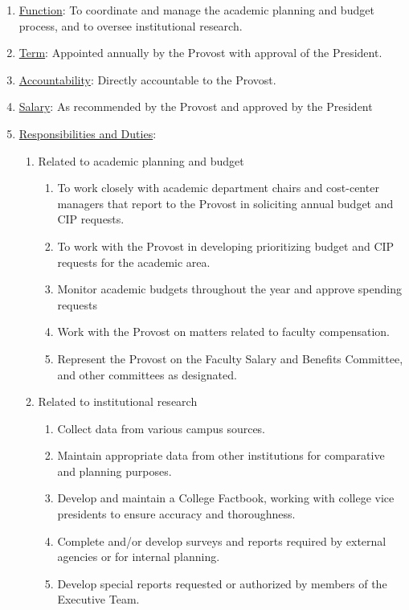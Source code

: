 \documentclass[letterpaper, 11pt]{article}
\begin{document}
					\begin{enumerate}[label=\alph*)]
						\item{\underline{Function}:  To coordinate and manage the academic planning and budget process, and to oversee institutional research.}
						\item{\underline{Term}:  Appointed annually by the Provost with approval of the President.}
						\item{\underline{Accountability}:  Directly accountable to the Provost.}
						\item{\underline{Salary}:  As recommended by the Provost and approved by the President}
						\item{\underline{Responsibilities and Duties}:
							\begin{enumerate}[label=\arabic*)]
								\item{Related to academic planning and budget
									\begin{enumerate}[label=(\alph*)]
										\item{To work closely with academic department chairs and cost-center managers that report to the Provost in soliciting annual budget and CIP requests.}
										\item{To work with the Provost in developing prioritizing budget and CIP requests for the academic area.}
										\item{Monitor academic budgets throughout the year and approve spending requests}
										\item{Work with the Provost on matters related to faculty compensation.}
										\item{Represent the Provost on the Faculty Salary and Benefits Committee, and other committees as designated.}
									\end{enumerate}
								}
								\item{Related to institutional research
									\begin{enumerate}[label=(\alph*)]
										\item{Collect data from various campus sources.}
										\item{Maintain appropriate data from other institutions for comparative and planning purposes.}
										\item{Develop and maintain a College Factbook, working with college vice presidents to ensure accuracy and thoroughness.}
										\item{Complete and/or develop surveys and reports required by external agencies or for internal planning.}
										\item{Develop special reports requested or authorized by members of the Executive Team.}
									\end{enumerate}
								}
							\end{enumerate}
						}
					\end{enumerate}
\end{document}
